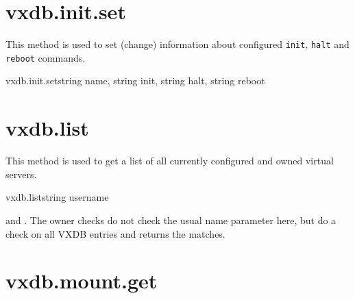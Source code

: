 \rpcnoerrors


\section{vxdb.init.set}

This method is used to set (change) information about configured \texttt{init},
\texttt{halt} and \texttt{reboot} commands.

\begin{rpcsynopsis}{vxdb.init.set}{string name, string init, string halt,
	string reboot}
\end{rpcsynopsis}

\rpcreturnnil

\rpcnoerrors


\section{vxdb.list}

This method is used to get a list of all currently configured and owned virtual
servers.

\begin{rpcsynopsis}{vxdb.list}{string username}
\end{rpcsynopsis}

\begin{rpcaccess}
\rpcnocapability and \rpcownerchecks. The owner checks do not check the
usual name parameter here, but do a check on all VXDB entries and returns
the matches.
\end{rpcaccess}



\rpcnoerrors


\section{vxdb.mount.get}

